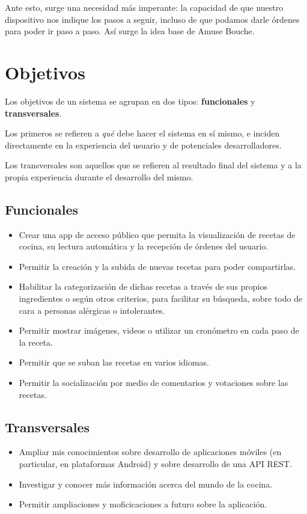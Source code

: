 Ante esto, surge una necesidad más imperante: la capacidad de que nuestro
dispositivo nos indique los pasos a seguir, incluso de que podamos darle
órdenes para poder ir paso a paso. Así surge la idea base de Amuse Bouche.


\section{Objetivos}
\label{sec:objetivos}

Los objetivos de un sistema se agrupan en dos tipos: \textbf{funcionales} y
\textbf{transversales}.

Los primeros se refieren a \textit{qué} debe hacer el sistema en sí mismo,
e inciden directamente en la experiencia del usuario y de potenciales
desarrolladores.

Los transversales son aquellos que se refieren al resultado final del sistema
y a la propia experiencia durante el desarrollo del mismo.

\subsection{Funcionales}
\begin{itemize}
\item Crear una app de acceso público que permita la visualización de recetas
  de cocina, su lectura automática y la recepción de órdenes del usuario.
\item Permitir la creación y la subida de nuevas recetas para poder compartirlas.
\item Habilitar la categorización de dichas recetas a través de sus propios
  ingredientes o según otros criterios, para facilitar su búsqueda, sobre todo
  de cara a personas alérgicas o intolerantes.
\item Permitir mostrar imágenes, videos o utilizar un cronómetro en cada paso
  de la receta.
\item Permitir que se suban las recetas en varios idiomas.
\item Permitir la socialización por medio de comentarios y votaciones sobre las
  recetas.
\end{itemize}


\subsection{Transversales}
\begin{itemize}
\item Ampliar mis conocimientos sobre desarrollo de aplicaciones móviles (en
  particular, en plataformas Android) y sobre desarrollo de una API REST.
\item Investigar y conocer más información acerca del mundo de la cocina.
\item Permitir ampliaciones y moficicaciones a futuro sobre la aplicación.
\end{itemize}


